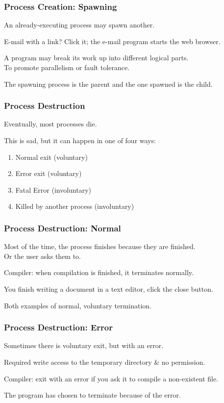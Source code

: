 \begin{frame}
\frametitle{Process Creation: Spawning}

An already-executing process may spawn another. 

E-mail with a link? Click it; the e-mail program starts the web browser.

A program may break its work up into different logical parts.\\
\quad To promote parallelism or fault tolerance. 

The spawning process is the \alert{parent} and the one spawned is the \alert{child}. 


\end{frame}

\begin{frame}
\frametitle{Process Destruction}

Eventually, most processes die. 

This is sad, but it can happen in one of four ways:
\begin{enumerate}
	\item Normal exit (voluntary) 
	\item Error exit (voluntary)
	\item Fatal Error (involuntary)
	\item Killed by another process (involuntary)
\end{enumerate}


\end{frame}

\begin{frame}
\frametitle{Process Destruction: Normal}

Most of the time, the process finishes because they are finished.\\
\quad Or the user asks them to. 

Compiler: when compilation is finished, it terminates normally. 

You finish writing a document in a text editor, click the close button.

Both examples of normal, voluntary termination.

\end{frame}

\begin{frame}
\frametitle{Process Destruction: Error}

Sometimes there is voluntary exit, but with an error. 

Required write access to the temporary directory \& no permission.

Compiler: exit with an error if you ask it to compile a non-existent file.

The program has chosen to terminate because of the error.

\end{frame}

